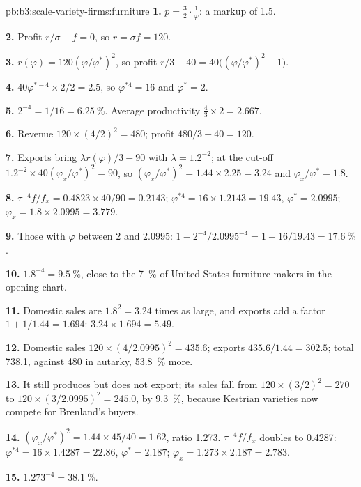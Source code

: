 \begin{solution}{pb:b3:scale-variety-firms:furniture}
\textbf{1.} $p = \tfrac{3}{2}\cdot\tfrac{1}{\varphi}$: a markup of 1.5. %

\textbf{2.} Profit $r/\sigma - f = 0$, so $r = \sigma f = 120$.

\textbf{3.} $r(\varphi) = 120(\varphi/\varphi^*)^2$, so profit $r/3 - 40 = 40\bigl((\varphi/\varphi^*)^2 - 1\bigr)$.

\textbf{4.} $40\varphi^{*-4} \times 2/2 = 2.5$, so $\varphi^{*4} = 16$ and $\varphi^* = 2$.

\textbf{5.} $2^{-4} = 1/16 = 6.25~\%$. Average productivity $\tfrac43 \times 2 = 2.667$.

\textbf{6.} Revenue $120 \times (4/2)^2 = 480$; profit $480/3 - 40 = 120$.

\textbf{7.} Exports bring $\lambda r(\varphi)/3 - 90$ with $\lambda = 1.2^{-2}$; at the cut-off
$1.2^{-2} \times 40(\varphi_x/\varphi^*)^2 = 90$, so $(\varphi_x/\varphi^*)^2 = 1.44 \times 2.25 = 3.24$ and
$\varphi_x/\varphi^* = 1.8$.

\textbf{8.} $\tau^{-4}f/f_x = 0.4823 \times 40/90 = 0.2143$; $\varphi^{*4} = 16 \times 1.2143 = 19.43$,
$\varphi^* = 2.0995$; $\varphi_x = 1.8 \times 2.0995 = 3.779$.

\textbf{9.} Those with $\varphi$ between 2 and 2.0995: $1 - 2^{-4}/2.0995^{-4} = 1 - 16/19.43 =
17.6~\%$.

\textbf{10.} $1.8^{-4} = 9.5~\%$, close to the 7~\% of United States furniture
makers in the opening chart. %

\textbf{11.} Domestic sales are $1.8^2 = 3.24$ times as large, and exports add a
factor $1 + 1/1.44 = 1.694$: $3.24 \times 1.694 = 5.49$.

\textbf{12.} Domestic sales $120 \times (4/2.0995)^2 = 435.6$; exports $435.6/1.44 = 302.5$;
total 738.1, against 480 in autarky, 53.8~\% more.

\textbf{13.} It still produces but does not export; its sales fall from $120 \times
(3/2)^2 = 270$ to $120 \times (3/2.0995)^2 = 245.0$, by 9.3~\%, because Kestrian varieties
now compete for Brenland's buyers.

\textbf{14.} $(\varphi_x/\varphi^*)^2 = 1.44 \times 45/40 = 1.62$, ratio 1.273. $\tau^{-4}f/f_x$ doubles to
0.4287: $\varphi^{*4} = 16 \times 1.4287 = 22.86$, $\varphi^* = 2.187$; $\varphi_x = 1.273 \times 2.187 = 2.783$.

\textbf{15.} $1.273^{-4} = 38.1~\%$.


\end{solution}
